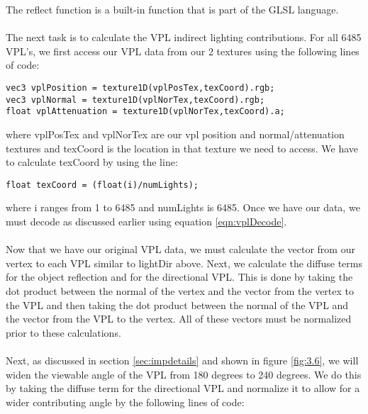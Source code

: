 The reflect function is a built-in function that is part of the GLSL language.  

\paragraph{}
The next task is to calculate the VPL indirect lighting contributions.  For all 6485 VPL's, we first access our VPL data from our 2 textures using the following lines of code:

\begin{lstlisting}
vec3 vplPosition = texture1D(vplPosTex,texCoord).rgb;
vec3 vplNormal = texture1D(vplNorTex,texCoord).rgb;
float vplAttenuation = texture1D(vplNorTex,texCoord).a;
\end{lstlisting}

where vplPosTex and vplNorTex are our vpl position and normal/attenuation textures and texCoord is the location in that texture we need to access.  We have to calculate texCoord by using the line:

\begin{lstlisting}
float texCoord = (float(i)/numLights);
\end{lstlisting}

where i ranges from 1 to 6485 and numLights is 6485.  Once we have our data, we must decode as discussed earlier using equation \ref{eqn:vplDecode}.  

\paragraph{}
Now that we have our original VPL data, we must calculate the vector from our vertex to each VPL similar to lightDir above.  Next, we calculate the diffuse terms for the object reflection and for the directional VPL.  This is done by taking the dot product between the normal of the vertex and the vector from the vertex to the VPL and then taking the dot product between the normal of the VPL and the vector from the VPL to the vertex.  All of these vectors must be normalized prior to these calculations.

\paragraph{}
Next, as discussed in section \ref{sec:impdetails} and shown in figure \ref{fig:3.6}, we will widen the viewable angle of the VPL from 180 degrees to 240 degrees.  We do this by taking the diffuse term for the directional VPL and normalize it to allow for a wider contributing angle by the following lines of code:

